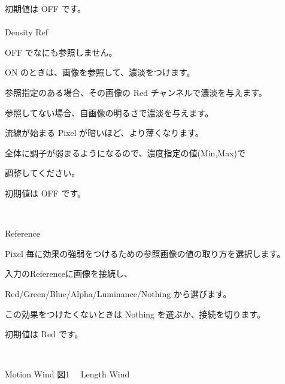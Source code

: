\documentclass[a4paper,12pt]{article}
\begin{document}
初期値は OFF です。\\
\\
Density Ref\par
OFF でなにも参照しません。\par
ON のときは、画像を参照して、濃淡をつけます。\par
参照指定のある場合、その画像の Red チャンネルで濃淡を与えます。\par
参照してない場合、自画像の明るさで濃淡を与えます。\par
流線が始まる Pixel が暗いほど、より薄くなります。\par
全体に調子が弱まるようになるので、濃度指定の値(Min,Max)で\par
調整してください。\par
初期値は OFF です。

\newpage

\thispagestyle{empty}

\ \vspace{1.3em}
\par
\noindent Reference\par
Pixel 毎に効果の強弱をつけるための参照画像の値の取り方を選択します。\par
入力の\textquotedbl Reference\textquotedbl に画像を接続し、\par
Red/Green/Blue/Alpha/Luminance/Nothing から選びます。\par
この効果をつけたくないときは Nothing を選ぶか、接続を切ります。\par
初期値は Red です。

\newpage

\thispagestyle{empty}

\ \vspace{-0.2em}
\par
\noindent Motion Wind 図1 \ \ Length Wind
\end{document}
